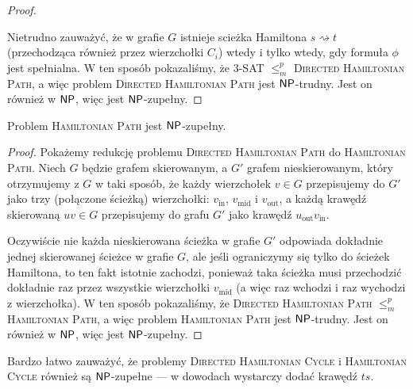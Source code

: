 \begin{proof}
\begin{enumerate}
\begin{figure}[H]
        \end{figure}
    \end{enumerate}

    Nietrudno zauważyć, że w grafie $G$ istnieje scieżka Hamiltona $s \rightsquigarrow t$ (przechodząca również przez wierzchołki $C_i$) wtedy i tylko wtedy, gdy formuła $\phi$ jest spełnialna. W ten sposób pokazaliśmy, że 3-SAT $\leq_m^p$ \textsc{Directed Hamiltonian Path}, a więc problem \textsc{Directed Hamiltonian Path} jest $\textsf{NP}$-trudny. Jest on również w $\textsf{NP}$, więc jest $\textsf{NP}$-zupełny.
\end{proof}

\begin{theorem}
    Problem \textsc{Hamiltonian Path} jest $\textsf{NP}$-zupełny.
\end{theorem}
\begin{proof}
    Pokażemy redukcję problemu \textsc{Directed Hamiltonian Path} do \textsc{Hamiltonian Path}. Niech $G$ będzie grafem skierowanym, a $G'$ grafem nieskierowanym, który otrzymujemy z $G$ w taki sposób, że każdy wierzchołek $v \in G$ przepisujemy do $G'$ jako trzy (połączone ścieżką) wierzchołki: $v_\text{in}$, $v_\text{mid}$ i $v_\text{out}$, a każdą krawędź skierowaną $uv \in G$ przepisujemy do grafu $G'$ jako krawędź $u_\text{out}v_\text{in}$.

    Oczywiście nie każda nieskierowana ścieżka w grafie $G'$ odpowiada dokładnie jednej skierowanej ścieżce w grafie $G$, ale jeśli ograniczymy się tylko do ścieżek Hamiltona, to ten fakt istotnie zachodzi, ponieważ taka ścieżka musi przechodzić dokładnie raz przez wszystkie wierzchołki $v_\text{mid}$ (a więc raz wchodzi i raz wychodzi z wierzchołka).
    W ten sposób pokazaliśmy, że \textsc{Directed Hamiltonian Path} $\leq_m^p$ \textsc{Hamiltonian Path}, a więc problem \textsc{Hamiltonian Path} jest $\textsf{NP}$-trudny. Jest on również w $\textsf{NP}$, więc jest $\textsf{NP}$-zupełny.
\end{proof}

Bardzo łatwo zauważyć, że problemy \textsc{Directed Hamiltonian Cycle} i \textsc{Hamiltonian Cycle} również są $\textsf{NP}$-zupełne --- w dowodach wystarczy dodać krawędź $ts$.

